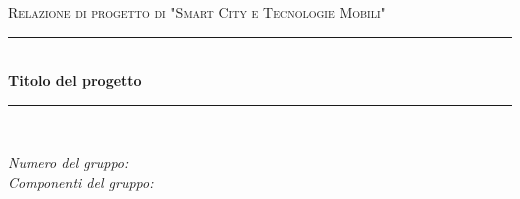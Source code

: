 \begin{titlepage}
  \newcommand{\HRule}{\rule{\linewidth}{0.5mm}}

  \center

  \textsc{\Large Relazione di progetto di "Smart City e Tecnologie Mobili"}\\[0.5cm]

  \HRule \\[0.4cm]
  { \huge \bfseries Titolo del progetto}\\[0.4cm]
  \HRule \\[1.5cm]

  \vfill

  \begin{flushleft}
  \emph{Numero del gruppo:}\\[1cm]
  \emph{Componenti del gruppo:}\\[3cm]
  \end{flushleft}
\end{titlepage}
